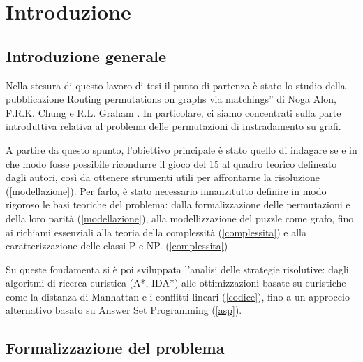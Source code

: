 \chapter{Introduzione}

\section{Introduzione generale}
Nella stesura di questo lavoro di tesi il punto di partenza è stato lo studio della pubblicazione Routing permutations on graphs via matchings” di Noga Alon, F.R.K. Chung e R.L. Graham \cite{14}. In particolare, ci siamo concentrati sulla parte introduttiva relativa al problema delle permutazioni di instradamento su grafi. 

A partire da questo spunto, l’obiettivo principale è stato quello di indagare se e in che modo fosse possibile ricondurre il gioco del 15 al quadro teorico delineato dagli autori, così da ottenere strumenti utili per affrontarne la risoluzione (\ref{modellazione}). Per farlo, è stato necessario innanzitutto definire in modo rigoroso le basi teoriche del problema: dalla formalizzazione delle permutazioni e della loro parità (\ref{modellazione}), alla modellizzazione del puzzle come grafo, fino ai richiami essenziali alla teoria della complessità (\ref{complessita}) e alla caratterizzazione delle classi P e NP. (\ref{complessita})

Su queste fondamenta si è poi sviluppata l’analisi delle strategie risolutive: dagli algoritmi di ricerca euristica (A*, IDA*) alle ottimizzazioni basate su euristiche come la distanza di Manhattan e i conflitti lineari (\ref{codice}), fino a un approccio alternativo basato su Answer Set Programming (\ref{asp}).

\section{Formalizzazione del problema} \cite{14}

